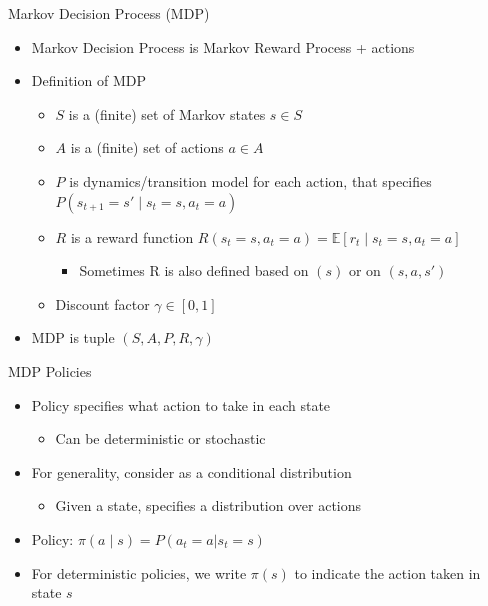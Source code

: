 \begin{frame}[c]{Markov Decision Process (MDP)}

\begin{itemize}
	\item Markov Decision Process is Markov Reward Process + actions
	\item Definition of MDP
	\begin{itemize}
		\item $S$ is a (finite) set of Markov states $s \in S$
		\item $A$ is a (finite) set of actions $a \in A$
		\item $P$ is dynamics/transition model for each action, that specifies $P(s_{t+1} = s' \mid s_t=s, a_t=a)$
		\item $R$ is a reward function 
		$R(s_t=s, a_t=a) = \mathbb{E}[r_t \mid s_t=s, a_t=a] $
		\begin{itemize}
			\item Sometimes R is also defined based on $(s)$ or on $(s,a,s')$
		\end{itemize}
		\item Discount factor $\gamma \in [0, 1]$
	\end{itemize}
	\item MDP is tuple $(S,A,P, R, \gamma)$
\end{itemize}

\end{frame}
\begin{frame}[c]{MDP Policies}

\begin{itemize}
	\item Policy specifies what action to take in each state
	\begin{itemize}
		\item Can be deterministic or stochastic
	\end{itemize}
	\item For generality, consider as a conditional distribution
	\begin{itemize}
		\item Given a state, specifies a distribution over actions
	\end{itemize}
	\item Policy: $\pi(a \mid s) = P(a_t=a | s_t = s)$
	\item For deterministic policies, we write $\pi(s)$ to indicate the action taken in state $s$
\end{itemize}


\end{frame}
